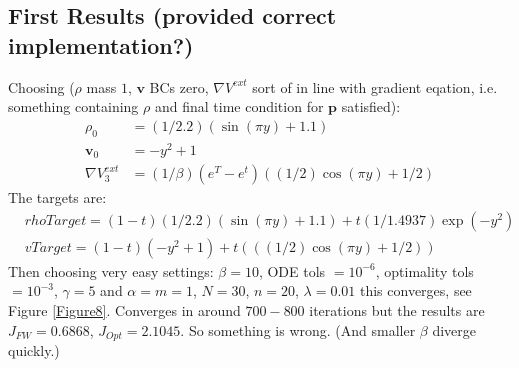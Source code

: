 \documentclass[11pt, a4paper]{article}
\theoremstyle{definition}
\newcommand{\Stav}{\mathbf{v}}
\begin{document}
\subsection{First Results (provided correct implementation?)}
Choosing ($\rho$ mass $1$, $\Stav$ BCs zero, $\nabla V^{ext}$ sort of in line with gradient eqation, i.e. something containing $\rho$ and final time condition for $\mathbf{p}$ satisfied):
\begin{align*}
\rho_0 &= (1/2.2)(\sin(\pi y) + 1.1)\\
\Stav_0 &=  -y^2 + 1\\
\nabla V^{ext}_3 &= (1/\beta)(e^{T}-e^t)((1/2)\cos(\pi y) +1/2)
\end{align*}
The targets are:
\begin{align*}
&rhoTarget = (1-t)(1/2.2)(\sin(\pi y) + 1.1) +  t(1/1.4937)\exp(-y^2)\\
&vTarget = (1 - t)(-y^2 + 1) + t(((1/2)\cos(\pi y) + 1/2))
\end{align*}
Then choosing very easy settings: $\beta = 10$, ODE tols $= 10^{-6}$, optimality tols $= 10^{-3}$, $\gamma = 5$ and $\alpha =m=1$, $N=30$, $n=20$, $\lambda = 0.01$ this converges, see Figure \ref{Figure8}. Converges in around $700 - 800$ iterations but the results are $J_{FW} = 0.6868$, $J_{Opt} = 2.1045$. So something is wrong. (And smaller $\beta$ diverge quickly.)
\end{document}
